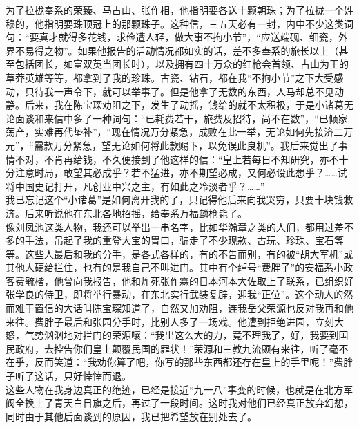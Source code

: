 为了拉拢奉系的荣臻、马占山、张作相，他指明要各送十颗朝珠；为了拉拢一个姓穆的，他指明要珠顶冠上的那颗珠子。这种信，三五天必有一封，内中不少这类词句：“要真才就得多花钱，求俭遭人轻，做大事不拘小节”，“应送端砚、细瓷，外界不易得之物”。如果他报告的活动情况都如实的话，差不多奉系的旅长以上（甚至包括团长，如富双英当团长时），以及拥有四十万众的红枪会首领、占山为王的草莽英雄等等，都拿到了我的珍珠。古瓷、钻石，都在我“不拘小节”之下大受感动，只待我一声令下，就可以举事了。但是他拿了无数的东西，人马却总不见动静。后来，我在陈宝琛劝阻之下，发生了动摇，钱给的就不太积极，于是小诸葛无论面谈和来信中多了一种词句：“已耗费若干，旅费及招待，尚不在数”，“已倾家荡产，实难再代垫补”，“现在情况万分紧急，成败在此一举，无论如何先接济二万元”，“需款万分紧急，望无论如何将此款赐下，以免误此良机”。我后来觉出了事情不对，不肯再给钱，不久便接到了他这样的信：“皇上若每日不知研究，亦不十分注意时局，敢望其必成乎？若不猛进，亦不期望必成，又何必设此想乎？……试将中国史记打开，凡创业中兴之主，有如此之冷淡者乎？……”\\

我已忘记这个“小诸葛”是如何离开我的了，只记得他后来向我哭穷，只要十块钱救济。后来听说他在东北各地招摇，给奉系万福麟枪毙了。\\

像刘凤池这类人物，我还可以举出一串名字，比如华瀚章之类的人们，都用过差不多的手法，吊起了我的重登大宝的胃口，骗走了不少现款、古玩、珍珠、宝石等等。这些人最后和我的分手，是各式各样的，有的不告而别，有的被“胡大军机”或其他人硬给拦住，也有的是我自己不叫进门。其中有个绰号“费胖子”的安福系小政客费毓楷，他曾向我报告，他和炸死张作霖的日本河本大佐取上了联系，已组织好张学良的侍卫，即将举行暴动，在东北实行武装复辟，迎我“正位”。这个动人的然而难于置信的大话叫陈宝琛知道了，自然又加劝阻，连我岳父荣源也反对我再和他来往。费胖子最后和张园分手时，比别人多了一场戏。他遭到拒绝进园，立刻大怒，气势汹汹地对拦门的荣源嚷：“我出这么大的力，竟不理我了，好，我要到国民政府，去控告你们皇上颠覆民国的罪状！”荣源和三教九流颇有来往，听了毫不在乎，反而笑道：“我劝你算了吧，你写的那些东西都还存在皇上的手里呢！”费胖子听了这话，只好悻悻而退。\\

这些人物在我身边真正的绝迹，已经是接近“九一八”事变的时候，也就是在北方军阀全换上了青天白日旗之后，再过了一段时间。这时我对他们已经真正放弃幻想，同时由于其他后面谈到的原因，我已把希望放在别处去了。\\